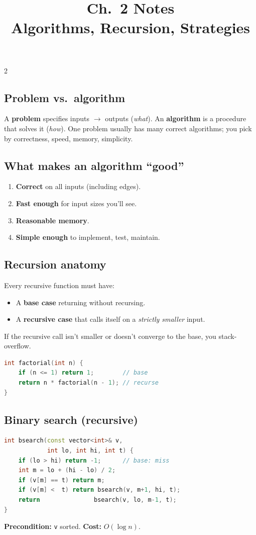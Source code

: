 \documentclass[10pt]{article}
\title{Ch.~2 Notes\\\large Algorithms, Recursion, Strategies}
\author{}
\date{}
\begin{document}
\maketitle
\vspace{-2em}

\begin{multicols}{2}

\subsection*{Problem vs.\ algorithm}
A \textbf{problem} specifies inputs $\to$ outputs (\emph{what}). An
\textbf{algorithm} is a procedure that solves it (\emph{how}). One problem
usually has many correct algorithms; you pick by correctness, speed,
memory, simplicity.

\subsection*{What makes an algorithm ``good''}
\begin{enumerate}
    \item \textbf{Correct} on all inputs (including edges).
    \item \textbf{Fast enough} for input sizes you'll see.
    \item \textbf{Reasonable memory}.
    \item \textbf{Simple enough} to implement, test, maintain.
\end{enumerate}

\subsection*{Recursion anatomy}
Every recursive function must have:
\begin{itemize}
    \item A \textbf{base case} returning without recursing.
    \item A \textbf{recursive case} that calls itself on a
    \emph{strictly smaller} input.
\end{itemize}
If the recursive call isn't smaller or doesn't converge to the base, you
stack-overflow.

\begin{lstlisting}[language=C++]
int factorial(int n) {
    if (n <= 1) return 1;        // base
    return n * factorial(n - 1); // recurse
}
\end{lstlisting}

\subsection*{Binary search (recursive)}
\begin{lstlisting}[language=C++]
int bsearch(const vector<int>& v,
            int lo, int hi, int t) {
    if (lo > hi) return -1;      // base: miss
    int m = lo + (hi - lo) / 2;
    if (v[m] == t) return m;
    if (v[m] <  t) return bsearch(v, m+1, hi, t);
    return               bsearch(v, lo, m-1, t);
}
\end{lstlisting}
\textbf{Precondition:} \texttt{v} sorted. \textbf{Cost:} $O(\log n)$.


\end{multicols}
\end{document}
